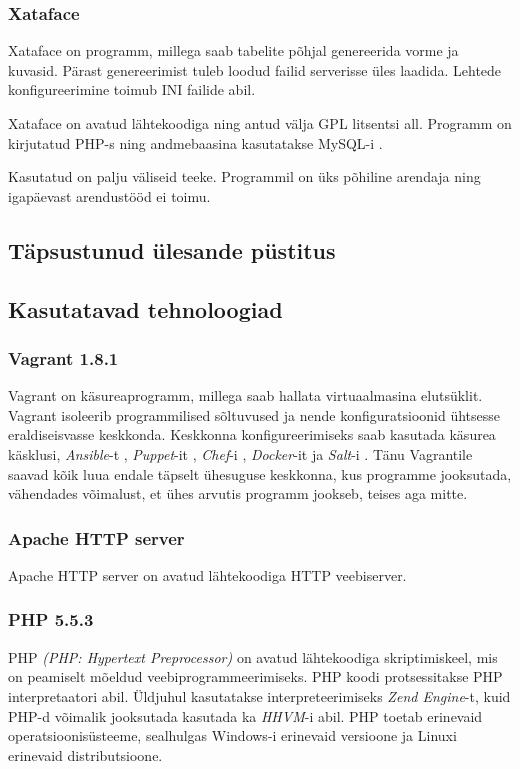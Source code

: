 \documentclass[a4paper,12pt]{article} %
\begin{document}
\subsubsection{Xataface}
Xataface on programm, millega saab tabelite põhjal genereerida vorme ja kuvasid. Pärast genereerimist tuleb loodud failid serverisse üles laadida. Lehtede konfigureerimine toimub INI failide abil.\cite{Xataface}\par
Xataface on avatud lähtekoodiga ning antud välja GPL litsentsi all. Programm on kirjutatud PHP-s \cite{PHP} ning andmebaasina kasutatakse MySQL-i \cite{MySQL}.\par
Kasutatud on palju väliseid teeke. Programmil on üks põhiline arendaja ning igapäevast arendustööd ei toimu. \cite{XatafaceGitHub}
\subsection{Täpsustunud ülesande püstitus}
\subsection{Kasutatavad tehnoloogiad}
\subsubsection{Vagrant 1.8.1}
Vagrant on käsureaprogramm, millega saab hallata virtuaalmasina elutsüklit. Vagrant isoleerib programmilised sõltuvused ja nende konfiguratsioonid ühtsesse eraldiseisvasse keskkonda. Keskkonna konfigureerimiseks saab kasutada käsurea käsklusi, \textit{Ansible}-t \cite{Ansible}, \textit{Puppet}-it \cite{Puppet}, \textit{Chef}-i \cite{Chef}, \textit{Docker}-it \cite{Docker} ja \textit{Salt}-i \cite{Salt}. Tänu Vagrantile saavad kõik luua endale täpselt ühesuguse keskkonna, kus programme jooksutada, vähendades võimalust, et ühes arvutis programm jookseb, teises aga mitte. \cite{Why_Vagrant}
\subsubsection{Apache HTTP server}
Apache HTTP server on avatud lähtekoodiga HTTP veebiserver.\cite{About_Apache_HTTPD}
\subsubsection{PHP 5.5.3}
PHP \textit{(PHP: Hypertext Preprocessor)} on avatud lähtekoodiga skriptimiskeel, mis on peamiselt mõeldud veebiprogrammeerimiseks. \cite{What_Is_PHP} PHP koodi protsessitakse PHP interpretaatori abil. Üldjuhul kasutatakse interpreteerimiseks \textit{Zend Engine}-t, kuid PHP-d võimalik jooksutada kasutada ka \textit{HHVM}-i \cite{HHVM} abil. PHP toetab erinevaid operatsioonisüsteeme, sealhulgas Windows-i erinevaid versioone ja Linuxi erinevaid distributsioone.
\end{document}
